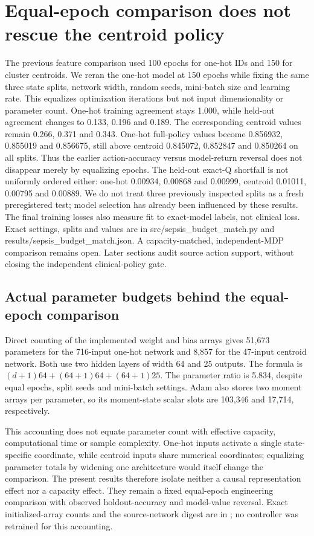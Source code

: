 \section{Equal-epoch comparison does not rescue the centroid policy}
The previous feature comparison used 100 epochs for one-hot IDs and 150 for cluster centroids. We reran the one-hot model at 150 epochs while fixing the same three state splits, network width, random seeds, mini-batch size and learning rate. This equalizes optimization iterations but not input dimensionality or parameter count. One-hot training agreement stays 1.000, while held-out agreement changes to 0.133, 0.196 and 0.189. The corresponding centroid values remain 0.266, 0.371 and 0.343. One-hot full-policy values become 0.856932, 0.855019 and 0.856675, still above centroid 0.845072, 0.852847 and 0.850264 on all splits. Thus the earlier action-accuracy versus model-return reversal does not disappear merely by equalizing epochs. The held-out exact-Q shortfall is not uniformly ordered either: one-hot 0.00934, 0.00868 and 0.00999, centroid 0.01011, 0.00795 and 0.00889. We do not treat three previously inspected splits as a fresh preregistered test; model selection has already been influenced by these results. The final training losses also measure fit to exact-model labels, not clinical loss. Exact settings, splits and values are in src/sepsis\_budget\_match.py and results/sepsis\_budget\_match.json. A capacity-matched, independent-MDP comparison remains open. Later sections audit source action support, without closing the independent clinical-policy gate.

\subsection{Actual parameter budgets behind the equal-epoch comparison}
Direct counting of the implemented weight and bias arrays gives 51,673 parameters for the 716-input one-hot network and 8,857 for the 47-input centroid network. Both use two hidden layers of width 64 and 25 outputs. The formula is $(d+1)64+(64+1)64+(64+1)25$. The parameter ratio is 5.834, despite equal epochs, split seeds and mini-batch settings. Adam also stores two moment arrays per parameter, so its moment-state scalar slots are 103,346 and 17,714, respectively.

This accounting does not equate parameter count with effective capacity, computational time or sample complexity. One-hot inputs activate a single state-specific coordinate, while centroid inputs share numerical coordinates; equalizing parameter totals by widening one architecture would itself change the comparison. The present results therefore isolate neither a causal representation effect nor a capacity effect. They remain a fixed equal-epoch engineering comparison with observed holdout-accuracy and model-value reversal. Exact initialized-array counts and the source-network digest are in ; no controller was retrained for this accounting.

